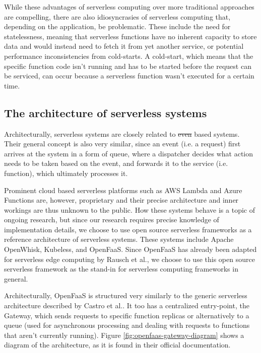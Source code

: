 \documentclass[draft,final]{vutinfth} %
\providecommand{\DIFaddtex}[1]{{\protect\color{blue}\uwave{#1}}} %
\providecommand{\DIFdeltex}[1]{{\protect\color{red}\sout{#1}}}                      %
\providecommand{\DIFaddbegin}{} %
\providecommand{\DIFaddend}{} %
\providecommand{\DIFdelbegin}{} %
\providecommand{\DIFdelend}{} %
\providecommand{\DIFadd}[1]{\texorpdfstring{\DIFaddtex{#1}}{#1}} %
\providecommand{\DIFdel}[1]{\texorpdfstring{\DIFdeltex{#1}}{}} %
\begin{document}
While these advantages of serverless computing over more traditional approaches are compelling, there are also idiosyncrasies of serverless computing that, depending on the application, be problematic.
These include the need for statelessness, meaning that serverless functions have no inherent capacity to store data and would instead need to fetch it from yet another service\cite{khandelwalTaureauDeconstructingServerless2020}, or potential performance inconsistencies from cold-starts.
A cold-start, which means that the specific function code isn't running and has to be started before the request can be serviced, can occur because a serverless function wasn't executed for a certain time\cite{wangPeekingCurtainsServerless2018}.

\subsection{The architecture of serverless systems}
Architecturally, serverless systems are closely related to \DIFdelbegin \DIFdel{even }\DIFdelend \DIFaddbegin \DIFadd{event }\DIFaddend based systems.
Their general concept is also very similar, since an event (i.e. a request) first arrives at the system in a form of queue, where a dispatcher \DIFaddbegin \DIFadd{or load balancer }\DIFaddend decides what action needs to be taken based on the event, and forwards it to the service (i.e. function), which ultimately processes it\cite{castroServerDeadLong2019}.

Prominent cloud based serverless platforms such as AWS Lambda\cite{aws-lambda} and Azure Functions\cite{azure-functions} are, however, proprietary and their precise architecture and inner workings are thus unknown to the public.
How these systems behave is a topic of ongoing research\cite{wangPeekingCurtainsServerless2018}, but since our research requires precise knowledge of implementation details, we choose to use open source serverless frameworks as a reference architecture of serverless systems.
These systems include Apache OpenWhisk\cite{openwhisk}, Kubeless\cite{kubeless}, and OpenFaaS\cite{openfaas}.
Since OpenFaaS has already been adapted for serverless edge computing by Rausch et al.\cite{rauschServerlessPlatformEdge}, we choose to use this open source serverless framework as the stand-in for serverless computing frameworks in general.

Architecturally, OpenFaaS is structured very similarly to the generic serverless architecture described by Castro et al.\cite{castroServerDeadLong2019}.
It too has a centralized entry-point, the Gateway, which sends requests to specific function replicas or alternatively to a queue (used for asynchronous processing and dealing with requests to functions that aren't currently running).
Figure \ref{fig:openfaas-gateway-diagram} shows a diagram of the architecture, as it is found in their official documentation\cite{openfaas-gateway}.
\end{document}

